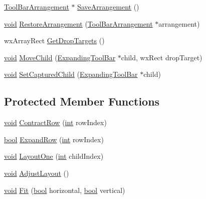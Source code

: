 \begin{DoxyCompactItemize}
\item 
\hyperlink{class_tool_bar_arrangement}{Tool\+Bar\+Arrangement} $\ast$ \hyperlink{class_tool_bar_area_a5453409c873f1210a7756974d59a66ad}{Save\+Arrangement} ()
\item 
\hyperlink{sound_8c_ae35f5844602719cf66324f4de2a658b3}{void} \hyperlink{class_tool_bar_area_a50bdd2eefa247c183dca292829d45d4e}{Restore\+Arrangement} (\hyperlink{class_tool_bar_arrangement}{Tool\+Bar\+Arrangement} $\ast$arrangement)
\item 
wx\+Array\+Rect \hyperlink{class_tool_bar_area_a8a05c5a8a59b2b247ee7c41da26ad970}{Get\+Drop\+Targets} ()
\item 
\hyperlink{sound_8c_ae35f5844602719cf66324f4de2a658b3}{void} \hyperlink{class_tool_bar_area_ada4bba85d81ec1e99610d4750873f3b0}{Move\+Child} (\hyperlink{class_expanding_tool_bar}{Expanding\+Tool\+Bar} $\ast$child, wx\+Rect drop\+Target)
\item 
\hyperlink{sound_8c_ae35f5844602719cf66324f4de2a658b3}{void} \hyperlink{class_tool_bar_area_a1b42e93e389a3a7495ed0c53b856909e}{Set\+Captured\+Child} (\hyperlink{class_expanding_tool_bar}{Expanding\+Tool\+Bar} $\ast$child)
\end{DoxyCompactItemize}
\subsection*{Protected Member Functions}
\begin{DoxyCompactItemize}
\item 
\hyperlink{sound_8c_ae35f5844602719cf66324f4de2a658b3}{void} \hyperlink{class_tool_bar_area_a1e5d2d3f34e23829ad02e2153c42a205}{Contract\+Row} (\hyperlink{xmltok_8h_a5a0d4a5641ce434f1d23533f2b2e6653}{int} row\+Index)
\item 
\hyperlink{mac_2config_2i386_2lib-src_2libsoxr_2soxr-config_8h_abb452686968e48b67397da5f97445f5b}{bool} \hyperlink{class_tool_bar_area_a0ca485ccd7b642d777d236dbd09ec37e}{Expand\+Row} (\hyperlink{xmltok_8h_a5a0d4a5641ce434f1d23533f2b2e6653}{int} row\+Index)
\item 
\hyperlink{sound_8c_ae35f5844602719cf66324f4de2a658b3}{void} \hyperlink{class_tool_bar_area_ad8eb8672c5541bd031ee6856d2176dcd}{Layout\+One} (\hyperlink{xmltok_8h_a5a0d4a5641ce434f1d23533f2b2e6653}{int} child\+Index)
\item 
\hyperlink{sound_8c_ae35f5844602719cf66324f4de2a658b3}{void} \hyperlink{class_tool_bar_area_a2297f35dd0705dc857974b5f558d9c5e}{Adjust\+Layout} ()
\item 
\hyperlink{sound_8c_ae35f5844602719cf66324f4de2a658b3}{void} \hyperlink{class_tool_bar_area_a09df514acb8b8a2e5d071b5b5d58523e}{Fit} (\hyperlink{mac_2config_2i386_2lib-src_2libsoxr_2soxr-config_8h_abb452686968e48b67397da5f97445f5b}{bool} horizontal, \hyperlink{mac_2config_2i386_2lib-src_2libsoxr_2soxr-config_8h_abb452686968e48b67397da5f97445f5b}{bool} vertical)
\end{DoxyCompactItemize}
